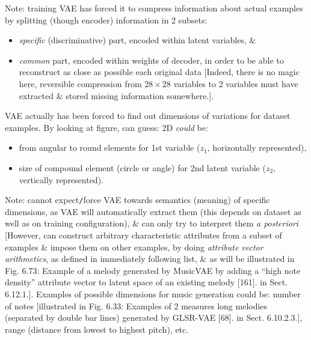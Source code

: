 \documentclass{article}
\begin{document}
\begin{itemize}
\begin{itemize}
\begin{itemize}
			Note: training VAE has forced it to compress information about actual examples by splitting (though encoder) information in 2 subsets:
			\begin{itemize}
				\item {\it specific} (discriminative) part, encoded within latent variables, \&
				\item {\it common} part, encoded within weights of decoder, in order to be able to reconstruct as close as possible each original data [Indeed, there is no magic here, reversible compression from $28\times28$ variables to 2 variables must have extracted \& stored missing information somewhere.].
			\end{itemize}
			VAE actually has been forced to find out dimensions of variations for dataset examples. By looking at figure, can guess: 2D {\it could} be:
			\begin{itemize}
				\item from angular to round elements for 1st variable ($z_1$, horizontally represented),
				\item size of compound element (circle or angle) for 2nd latent variable ($z_2$, vertically represented).
			\end{itemize}
			Note: cannot expect{\tt/}force VAE towards semantics (meaning) of specific dimensions, as VAE will automatically extract them (this depends on dataset as well as on training configuration), \& can only try to interpret them {\it a posteriori} [However, can construct arbitrary characteristic attributes from a subset of examples \& impose them on other examples, by doing {\it attribute vector arithmetics}, as defined in immediately following list, \& as will be illustrated in {\sf Fig. 6.73: Example of a melody generated by MusicVAE by adding a ``high note density'' attribute vector to latent space of an existing melody [161].} in Sect. 6.12.1.]. Examples of possible dimensions for music generation could be: number of notes [illustrated in {\sf Fig. 6.33: Examples of 2 measures long melodies (separated by double bar lines) generated by GLSR-VAE [68].} in Sect. 6.10.2.3.], range (distance from lowest to highest pitch), etc.
			

\end{itemize}
\end{itemize}
\end{itemize}
\end{document}

